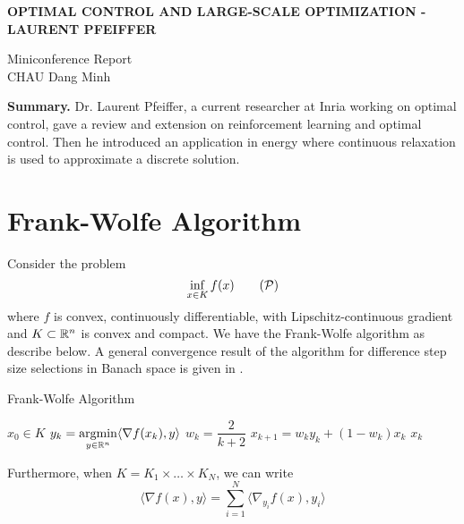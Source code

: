 \begin{center}
    \textbf{\Large OPTIMAL CONTROL AND LARGE-SCALE OPTIMIZATION - LAURENT PFEIFFER} \\
    \vspace{0.5cm}

    Miniconference Report \\
    CHAU Dang Minh
\end{center}

\begin{center}
    \begin{minipage}{0.85\textwidth}
        \textbf{Summary.} Dr. Laurent Pfeiffer, a current researcher at Inria working on optimal control, gave a review and extension on reinforcement learning and optimal control. Then he introduced an application in energy where continuous relaxation is used to approximate a discrete solution.
    \end{minipage}
\end{center}

\section{Frank-Wolfe Algorithm}
Consider the problem
\begin{equation}
    \inf\limits_{x\in K}f(x) \tag{$\mathcal{P}$}
\end{equation}
where $f$ is convex, continuously differentiable, with Lipschitz-continuous gradient and $K\subset{\mathbb{R}}^n$ is convex and compact. We have the Frank-Wolfe algorithm as describe below. A general convergence result of the algorithm for difference step size selections in Banach space is given in \cite{xu2017convergence}.

\begin{algorithm}
    \caption{Frank-Wolfe Algorithm}
    \label{alg:cap}
    \begin{algorithmic}
        \Require $x_0\in K$
        \State $y_k = \operatorname*{argmin}\limits_{y\in{\mathbb{R}}^n}
            \langle\nabla f(x_k), y\rangle$
        \State $w_k=\dfrac{2}{k+2}$
        \State $x_{k+1} = w_k y_k + (1-w_k)x_k$
        \EndFor
        \Ensure $x_k$
    \end{algorithmic}
\end{algorithm}

Furthermore, when $K=K_1\times\ldots\times K_N$, we can write
\begin{equation}
    \langle\nabla f(x), y\rangle = \sum\limits_{i=1}^N \langle\nabla_{y_i} f(x), y_i\rangle
\end{equation}

